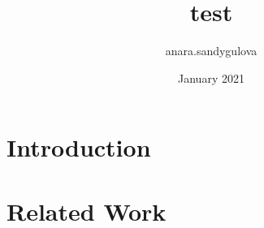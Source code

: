 \documentclass{article}
\title{test}
\author{anara.sandygulova }
\date{January 2021}
\begin{document}
\maketitle

\section{Introduction}

\section{Related Work}
\end{document}
